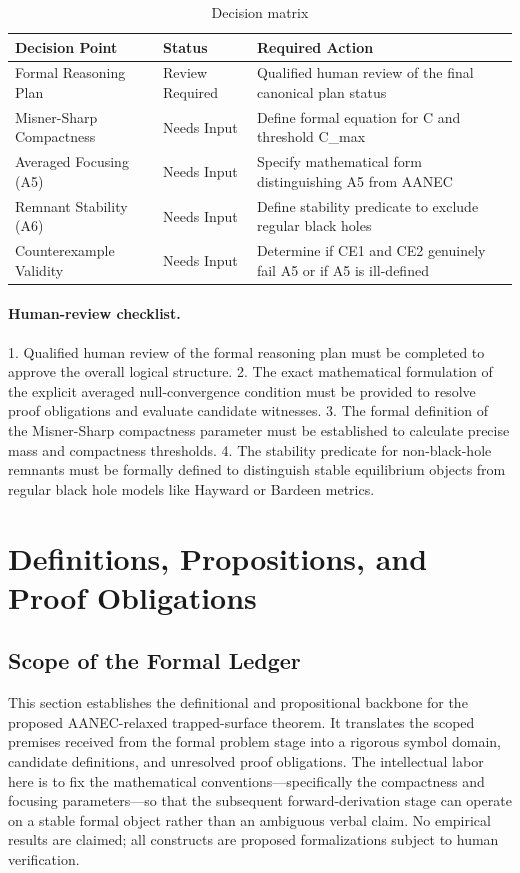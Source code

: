 \documentclass[conference]{IEEEtran}
\begin{document}
\begin{table}[htbp]
\centering
\footnotesize
\setlength{\tabcolsep}{3pt}
\renewcommand{\arraystretch}{1.12}
\caption{Decision matrix}
\label{tab:risk-limitations-and-review-decision-matrix}
\begin{tabular}{|p{}|p{}|p{}|}
\hline
Decision Point & Status & Required Action \\\hline
Formal Reasoning Plan & Review Required & Qualified human review of the final canonical plan status \\\hline
Misner-Sharp Compactness & Needs Input & Define formal equation for C and threshold C\_max \\\hline
Averaged Focusing (A5) & Needs Input & Specify mathematical form distinguishing A5 from AANEC \\\hline
Remnant Stability (A6) & Needs Input & Define stability predicate to exclude regular black holes \\\hline
Counterexample Validity & Needs Input & Determine if CE1 and CE2 genuinely fail A5 or if A5 is ill-defined \\\hline
\end{tabular}
\end{table}

\paragraph{Human-review checklist.} 1. Qualified human review of the formal reasoning plan must be completed to approve the overall logical structure. 2. The exact mathematical formulation of the explicit averaged null-convergence condition must be provided to resolve proof obligations and evaluate candidate witnesses. 3. The formal definition of the Misner-Sharp compactness parameter must be established to calculate precise mass and compactness thresholds. 4. The stability predicate for non-black-hole remnants must be formally defined to distinguish stable equilibrium objects from regular black hole models like Hayward or Bardeen metrics.

\section{Definitions, Propositions, and Proof Obligations}
\subsection{Scope of the Formal Ledger}
This section establishes the definitional and propositional backbone for the proposed AANEC-relaxed trapped-surface theorem. It translates the scoped premises received from the formal problem stage into a rigorous symbol domain, candidate definitions, and unresolved proof obligations. The intellectual labor here is to fix the mathematical conventions—specifically the compactness and focusing parameters—so that the subsequent forward-derivation stage can operate on a stable formal object rather than an ambiguous verbal claim. No empirical results are claimed; all constructs are proposed formalizations subject to human verification.
\end{document}
